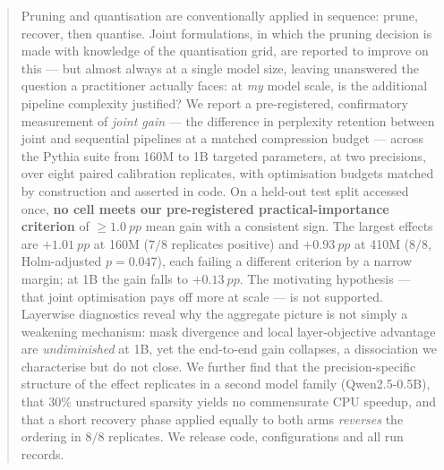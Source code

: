 %
%

\begin{abstract}
Pruning and quantisation are conventionally applied in sequence: prune, recover, then
quantise. Joint formulations, in which the pruning decision is made with knowledge of the
quantisation grid, are reported to improve on this --- but almost always at a single model
size, leaving unanswered the question a practitioner actually faces: at \emph{my} model
scale, is the additional pipeline complexity justified? We report a pre-registered,
confirmatory measurement of \emph{joint gain} --- the difference in perplexity retention
between joint and sequential pipelines at a matched compression budget --- across the Pythia
suite from 160M to 1B targeted parameters, at two precisions, over eight paired calibration
replicates, with optimisation budgets matched by construction and asserted in code. On a
held-out test split accessed once, \textbf{no cell meets our pre-registered
practical-importance criterion} of $\geq\!\SI{1.0}{pp}$ mean gain with a consistent sign.
The largest effects are $+\SI{1.01}{pp}$ at 160M ($7/8$ replicates positive) and
$+\SI{0.93}{pp}$ at 410M ($8/8$, Holm-adjusted $p = 0.047$), each failing a different
criterion by a narrow margin; at 1B the gain falls to $+\SI{0.13}{pp}$. The motivating
hypothesis --- that joint optimisation pays off more at scale --- is not supported. Layerwise
diagnostics reveal why the aggregate picture is not simply a weakening mechanism: mask
divergence and local layer-objective advantage are \emph{undiminished} at 1B, yet the
end-to-end gain collapses, a dissociation we characterise but do not close. We further find
that the precision-specific structure of the effect replicates in a second model family
(Qwen2.5-0.5B), that $30\%$ unstructured sparsity yields no commensurate CPU speedup, and
that a short recovery phase applied equally to both arms \emph{reverses} the ordering in
$8/8$ replicates. We release code, configurations and all run records.
\end{abstract}

